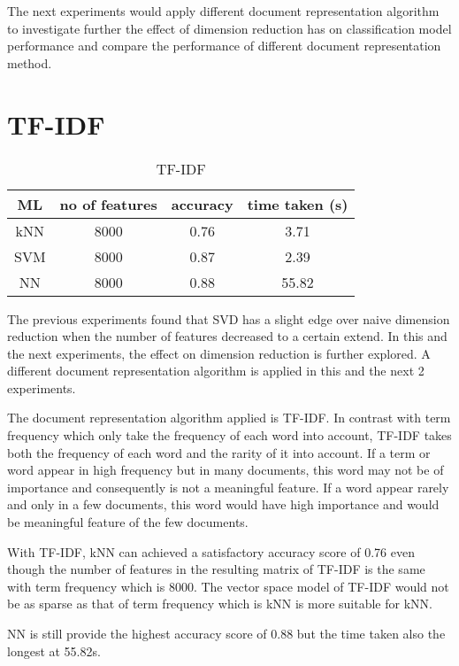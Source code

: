 The next experiments would apply different document representation algorithm to investigate further the effect of dimension reduction has on classification model performance and compare the performance of different document representation method.\\

\clearpage
\section{TF-IDF}

\begin{table} [ht]
	\centering
	\begin{tabular}{|| c | c | c | c||}
		\hline
		ML & no of features & accuracy & time taken (s) \\ [0.5ex]
		\hline\hline
		kNN & 8000 & 0.76 & 3.71 \\ 
		\hline
		SVM & 8000 & 0.87 & 2.39 \\
		\hline
		NN & 8000 & 0.88 & 55.82 \\
		\hline
	\end{tabular}
\caption{TF-IDF}
\label{tbl:tfidf}
\end{table}

The previous experiments found that SVD has a slight edge over naive dimension reduction when the number of features decreased to a certain extend. In this and the next experiments, the effect on dimension reduction is further explored. A different document representation algorithm is applied in this and the next 2 experiments.
 
The document representation algorithm applied is TF-IDF. In contrast with term frequency which only take the frequency of each word into account, TF-IDF takes both the frequency of each word and the rarity of it into account. If a term or word appear in high frequency but in many documents, this word may not be of importance and consequently is not a meaningful feature. If a word appear rarely and only in a few documents, this word would have high importance and would be meaningful feature of the few documents.

With TF-IDF, kNN can achieved a satisfactory accuracy score of 0.76 even though the number of features in the resulting matrix of TF-IDF is the same with term frequency which is 8000. The vector space model of TF-IDF would not be as sparse as that of term frequency which is kNN is more suitable for kNN.

NN is still provide the highest accuracy score of 0.88 but the time taken also the longest at 55.82s.

